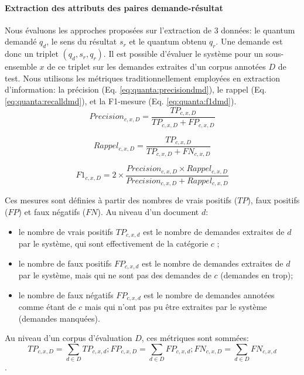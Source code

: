 \paragraph{Extraction des attributs des paires demande-résultat}
 Nous évaluons les approches proposées sur l'extraction de 3 données: le quantum demandé $q_d$, le sens du résultat $s_r$ et le quantum obtenu $q_r$. Une demande est donc un triplet $(q_d, s_r, q_r)$. Il est possible d'évaluer le système pour un sous-ensemble $x$ de ce triplet sur les demandes extraites d'un corpus annotées $D$ de test. Nous utilisons les métriques traditionnellement employées en extraction d'information: la précision (Eq. \ref{eq:quanta:precisiondmd}), le rappel (Eq. \ref{eq:quanta:recalldmd}), et la F1-mesure (Eq. \ref{eq:quanta:f1dmd}). 
 \begin{equation}
 Precision_{c,x,D} = \frac{TP_{c,x,D}}{TP_{c,x,D} + FP_{c,x,D}}  \label{eq:quanta:precisiondmd}
\end{equation}

\begin{equation}
Rappel_{c,x,D} = \frac{TP_{c,x,D}}{TP_{c,x,D} + FN_{c,x,D}} \label{eq:quanta:recalldmd}
\end{equation}

\begin{equation}
F1_{c,x,D} =2 \times \frac{Precision_{c,x,D} \times Rappel_{c,x,D}}{Precision_{c,x,D} + Rappel_{c,x,D}} \label{eq:quanta:f1dmd}
\end{equation}

Ces mesures sont définies à partir des nombres de vrais positifs ($TP$), faux positifs ($FP$) et faux négatifs ($FN$). Au niveau d'un document $d$:
\begin{itemize}
\item le nombre de vrais positifs $TP_{c, x, d}$ est le nombre de demandes extraites de $d$ par le système, qui sont effectivement de la catégorie $c$ ;
\item le nombre de faux positifs $FP_{c, x, d}$ est le nombre de demandes extraites de $d$ par le système, mais qui ne sont pas des demandes de $c$ (demandes en trop);
\item le nombre de faux négatifs $FP_{c, x, d}$ est le nombre de demandes annotées comme étant de $c$ mais qui n'ont pas pu être extraites par le système (demandes manquées).
\end{itemize}

Au niveau d'un corpus d'évaluation $D$, ces métriques sont sommées: 
\[TP_{c,x,D} = \sum\limits_{d \in D} TP_{c,x,d}; FP_{c,x,D} = \sum\limits_{d \in D} FP_{c,x,d}; FN_{c,x,D} = \sum\limits_{d \in D} FN_{c,x,d}\].

